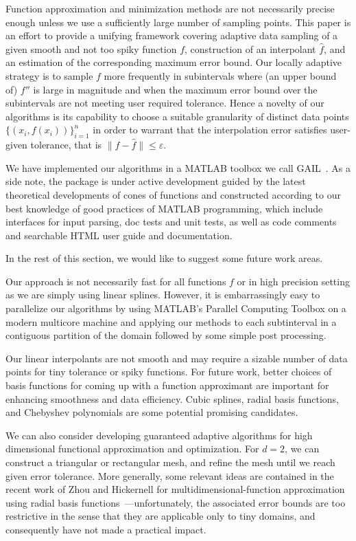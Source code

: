 \documentclass[review]{elsarticle}
\newcommand{\abstol}{\varepsilon}
\theoremstyle{definition}
\begin{document}
Function approximation and minimization methods are not necessarily precise
enough unless we use a sufficiently large number of sampling points. This paper
is an effort to provide a unifying framework covering adaptive data sampling of
a given smooth and not too spiky function $f$, construction of an interpolant
$\hat{f}$, and an estimation of the corresponding maximum error bound. Our
locally adaptive strategy is to sample $f$ more frequently in subintervals where
(an upper bound of) $f''$ is large in magnitude and when the maximum error bound
over the subintervals are not meeting user required tolerance. Hence a novelty
of our algorithms is its capability to choose a suitable granularity of distinct
data points $\{(x_i, f(x_i))\}_{i=1}^n$ in order to warrant that the
interpolation error satisfies user-given tolerance, that is $\| f - \hat{f} \|
\le \abstol$. 

We have implemented our algorithms in a MATLAB toolbox we call
GAIL~\cite{ChoEtal15a}. As a side note, the package is under active development
guided by the latest theoretical developments of cones of functions and
constructed according to our best knowledge of good practices of MATLAB
programming, which include interfaces for input parsing, doc tests and unit
tests, as well as code comments and searchable HTML user guide and
documentation.

In the rest of this section, we would like to suggest some future work areas.

Our approach is not necessarily fast for all functions $f$ or in high precision
setting as we are simply using linear splines. However, it is embarrassingly
easy to parallelize our algorithms by using MATLAB's Parallel Computing Toolbox
on a modern multicore machine and applying our methods to each subtinterval in a
contiguous partition of the domain followed by some simple post processing. 

Our linear interpolants are not smooth and may require a sizable number of data
points for tiny tolerance or spiky functions. For future work, better choices of
basis functions for coming up with a function approximant are important for
enhancing smoothness and data efficiency. Cubic splines, radial basis functions,
and Chebyshev polynomials are some potential promising candidates.

We can also consider developing guaranteed adaptive algorithms for high
dimensional functional approximation and optimization. For $d=2$, we can
construct a triangular or rectangular mesh, and refine the mesh until we reach
given error tolerance. More generally, some relevant ideas are contained in the
recent work of Zhou and Hickernell for multidimensional-function approximation
using radial basis functions~\cite{ZhoHic15a}---unfortunately, the associated
error bounds are too restrictive in the sense that they are applicable only to
tiny domains, and consequently have not made a practical impact.
\end{document}
